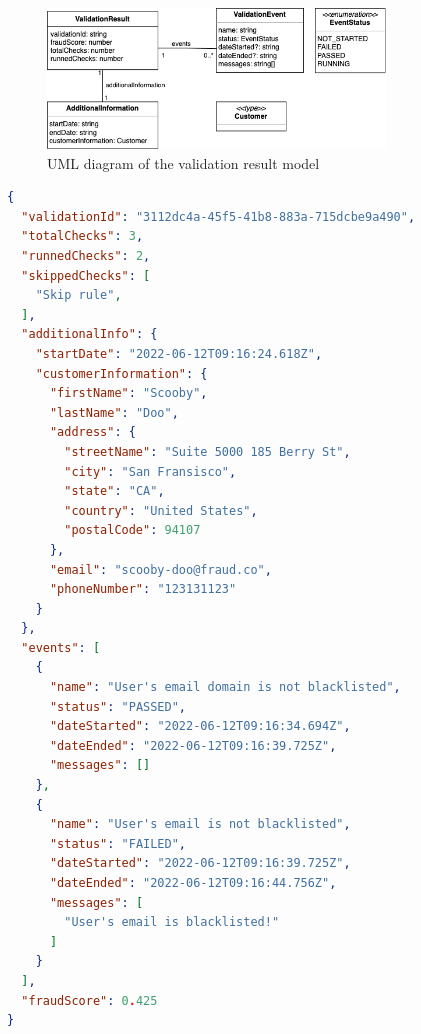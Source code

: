     \begin{figure}[!ht]
      \centering
      \includegraphics[width=0.8\textwidth]{diagrams/entity-validationresult.png}
      \caption{UML diagram of the validation result model}
      \label{fig:uml_validation_result}
    \end{figure}
    
    \newpage
    \begin{lstlisting}[caption={Validation result example (JSON)}, language=json]
{
  "validationId": "3112dc4a-45f5-41b8-883a-715dcbe9a490",
  "totalChecks": 3,
  "runnedChecks": 2,
  "skippedChecks": [
    "Skip rule",
  ],
  "additionalInfo": {
    "startDate": "2022-06-12T09:16:24.618Z",
    "customerInformation": {
      "firstName": "Scooby",
      "lastName": "Doo",
      "address": {
        "streetName": "Suite 5000 185 Berry St",
        "city": "San Fransisco",
        "state": "CA",
        "country": "United States",
        "postalCode": 94107
      },
      "email": "scooby-doo@fraud.co",
      "phoneNumber": "123131123"
    }
  },
  "events": [
    {
      "name": "User's email domain is not blacklisted",
      "status": "PASSED",
      "dateStarted": "2022-06-12T09:16:34.694Z",
      "dateEnded": "2022-06-12T09:16:39.725Z",
      "messages": []
    },
    {
      "name": "User's email is not blacklisted",
      "status": "FAILED",
      "dateStarted": "2022-06-12T09:16:39.725Z",
      "dateEnded": "2022-06-12T09:16:44.756Z",
      "messages": [
        "User's email is blacklisted!"
      ]
    }
  ],
  "fraudScore": 0.425  
}
    \end{lstlisting}